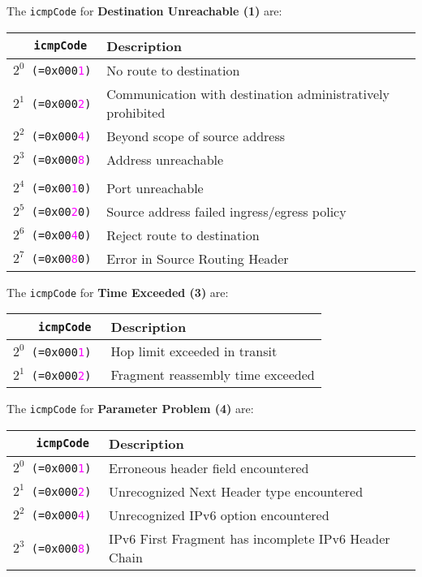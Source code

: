 \documentclass[documentation]{subfiles}
\begin{document}
The {\tt icmpCode} for {\bf Destination Unreachable (1)} are:
\begin{longtable}{>{\tt}rl}
    \toprule
    {\bf icmpCode} & {\bf Description}\\
    \midrule\endhead%
    $2^{0}$ (=0x000\textcolor{magenta}{1}) & No route to destination\\
    $2^{1}$ (=0x000\textcolor{magenta}{2}) & Communication with destination administratively prohibited\\
    $2^{2}$ (=0x000\textcolor{magenta}{4}) & Beyond scope of source address\\
    $2^{3}$ (=0x000\textcolor{magenta}{8}) & Address unreachable\\
    \\
    $2^{4}$ (=0x00\textcolor{magenta}{1}0) & Port unreachable\\
    $2^{5}$ (=0x00\textcolor{magenta}{2}0) & Source address failed ingress/egress policy\\
    $2^{6}$ (=0x00\textcolor{magenta}{4}0) & Reject route to destination\\
    $2^{7}$ (=0x00\textcolor{magenta}{8}0) & Error in Source Routing Header\\
    \bottomrule
\end{longtable}

The {\tt icmpCode} for {\bf Time Exceeded (3)} are:
\begin{longtable}{>{\tt}rl}
    \toprule
    {\bf icmpCode} & {\bf Description}\\
    \midrule\endhead%
    $2^{0}$ (=0x000\textcolor{magenta}{1}) & Hop limit exceeded in transit\\
    $2^{1}$ (=0x000\textcolor{magenta}{2}) & Fragment reassembly time exceeded\\
    \bottomrule
\end{longtable}

The {\tt icmpCode} for {\bf Parameter Problem (4)} are:
\begin{longtable}{>{\tt}rl}
    \toprule
    {\bf icmpCode} & {\bf Description}\\
    \midrule\endhead%
    $2^{0}$ (=0x000\textcolor{magenta}{1}) & Erroneous header field encountered\\
    $2^{1}$ (=0x000\textcolor{magenta}{2}) & Unrecognized Next Header type encountered\\
    $2^{2}$ (=0x000\textcolor{magenta}{4}) & Unrecognized IPv6 option encountered\\
    $2^{3}$ (=0x000\textcolor{magenta}{8}) & IPv6 First Fragment has incomplete IPv6 Header Chain\\
    \bottomrule
\end{longtable}
\end{document}
